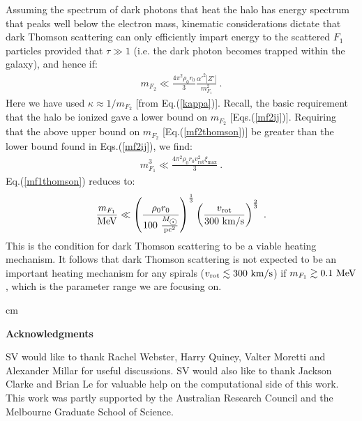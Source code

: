 \documentclass[12pt]{article}
\begin{document}
{{Assuming the spectrum of dark photons that heat the halo has energy spectrum that peaks well below the electron mass, kinematic considerations dictate that dark Thomson scattering can only efficiently impart energy to the scattered $F_1$ particles provided that $\tau \gg 1$ (i.e. the dark photon becomes trapped within the galaxy), and hence if:
%
\begin{eqnarray}
m _{F_2} \ll \frac{4\pi ^2\rho _0r _0}{3}\frac{{\alpha '} ^2|Z'|}{m _{F_1} ^2} \ .
\label{mf2thomson}
\end{eqnarray}
%
Here we have used $\kappa \approx 1/m _{F_2}$ [from Eq.(\ref{kappa})]. Recall, the basic requirement that the halo be ionized gave a lower bound on $m _{F_2}$ [Eqs.(\ref{mf2ij})]. Requiring that the above upper bound on $m _{F_2}$ [Eq.(\ref{mf2thomson})] be greater than the lower bound found in Eqs.(\ref{mf2ij}), we find:
%
\begin{eqnarray}
m _{F_1} ^3 \ll \frac{4\pi ^2\rho _0r _0v _{\text{rot}} ^2\xi _{\max}}{3} \ .
\label{mf1thomson}
\end{eqnarray}
%
Eq.(\ref{mf1thomson}) reduces to:
%
\begin{eqnarray}
\frac{m _{F_1}}{{\rm MeV}} \ll \left ( \frac{\rho _0r _0}{100 \ \frac{M _{\astrosun}}{{\rm pc ^2}}} \right ) ^{\frac{1}{3}}\left ( \frac{v _{\text{rot}}}{300 \ \rm km/s} \right )^{\frac{2}{3}} \ .
\end{eqnarray}
%
This is the condition for dark Thomson scattering to be a viable heating mechanism. It follows that dark Thomson scattering is not expected to be an important heating mechanism for any spirals ($v _{\text{rot}} \lesssim 300 \ \rm km/s$) if $m _{F_1} \gtrsim 0.1 \ \rm MeV$, which is the parameter range we are focusing on.

 cm

\begin{flushleft}

{\Large \bf Acknowledgments}

\end{flushleft}

\vskip 0.2cm
\noindent
SV would like to thank Rachel Webster, Harry Quiney, Valter Moretti and Alexander Millar for useful discussions. SV would also like to thank Jackson Clarke and Brian Le for valuable help on the computational side of this work. This work was partly supported by the Australian Research Council and the Melbourne Graduate School of Science.


\begin{thebibliography}{999}


\end{thebibliography}}}
\end{document}
